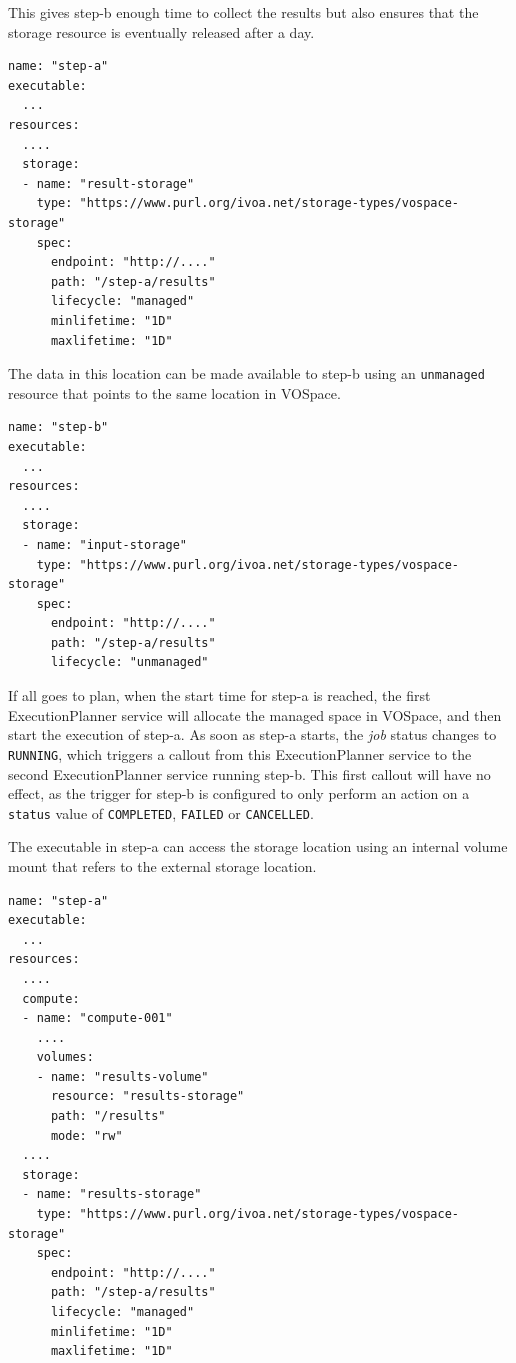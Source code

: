 \documentclass[11pt,a4paper]{ivoa}
\newcommand{\vospace} {VOSpace}
\newcommand{\execplanner} {ExecutionPlanner}
\newcommand{\codeword}[1] {\texttt{#1}}
\newcommand{\job} {\textit{job}}
\begin{document}
This gives step-b enough time to collect the results but also ensures that the storage resource
is eventually released after a day.

\begin{lstlisting}[]
name: "step-a"
executable:
  ...
resources:
  ....
  storage:
  - name: "result-storage"
    type: "https://www.purl.org/ivoa.net/storage-types/vospace-storage"
    spec:
      endpoint: "http://...."
      path: "/step-a/results"
      lifecycle: "managed"
      minlifetime: "1D"
      maxlifetime: "1D"
\end{lstlisting}

The data in this location can be made available to step-b using an \codeword{unmanaged} resource
that points to the same location in \vospace{}.

\begin{lstlisting}[]
name: "step-b"
executable:
  ...
resources:
  ....
  storage:
  - name: "input-storage"
    type: "https://www.purl.org/ivoa.net/storage-types/vospace-storage"
    spec:
      endpoint: "http://...."
      path: "/step-a/results"
      lifecycle: "unmanaged"
\end{lstlisting}

If all goes to plan, when the start time for step-a is reached, the first \execplanner{}
service will allocate the managed space in \vospace{}, and then start the execution of step-a.
As soon as step-a starts, the \job{} status changes to \codeword{RUNNING},
which triggers a callout from this \execplanner{} service to the second
\execplanner{} service running step-b.
This first callout will have no effect, as the trigger
for step-b is configured to only perform an action on a \codeword{status}
value of \codeword{COMPLETED}, \codeword{FAILED} or \codeword{CANCELLED}.

The executable in step-a can access the storage location using an internal
volume mount that refers to the external storage location.

\begin{lstlisting}[]
name: "step-a"
executable:
  ...
resources:
  ....
  compute:
  - name: "compute-001"
    ....
    volumes:
    - name: "results-volume"
      resource: "results-storage"
      path: "/results"
      mode: "rw"
  ....
  storage:
  - name: "results-storage"
    type: "https://www.purl.org/ivoa.net/storage-types/vospace-storage"
    spec:
      endpoint: "http://...."
      path: "/step-a/results"
      lifecycle: "managed"
      minlifetime: "1D"
      maxlifetime: "1D"
\end{lstlisting}
\end{document}
